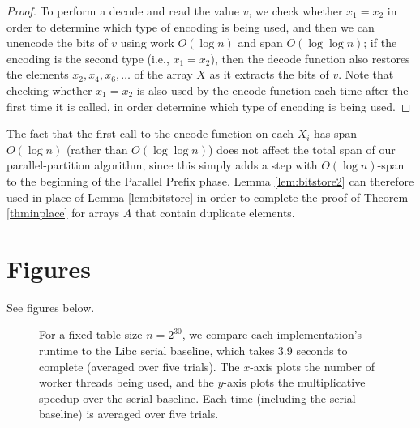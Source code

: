 \documentclass[sigplan, 10pt, nonacm]{acmart}
\theoremstyle{remark}
\theoremstyle{remark}
\begin{document}
\begin{appendices}
\begin{proof}
To perform a decode and read the value $v$, we check whether $x_1 =
x_2$ in order to determine which type of encoding is being used, and
then we can unencode the bits of $v$ using work $O(\log n)$ and span
$O(\log \log n)$; if the encoding is the second type (i.e., $x_1 =
x_2$), then the decode function also restores the elements $x_2, x_4,
x_6, \ldots$ of the array $X$ as it extracts the bits of $v$. Note
that checking whether $x_1 = x_2$ is also used by the encode function
each time after the first time it is called, in order determine which
type of encoding is being used.
\end{proof}

The fact that the first call to the encode function on each $X_i$ has
span $O(\log n)$ (rather than $O(\log \log n)$) does not affect the
total span of our parallel-partition algorithm, since this simply adds
a step with $O(\log n)$-span to the beginning of the Parallel Prefix
phase. Lemma \ref{lem:bitstore2} can therefore used in place of Lemma
\ref{lem:bitstore} in order to complete the proof of Theorem
\ref{thminplace} for arrays $A$ that contain duplicate elements.

\section{Figures}
See figures below.
\begin{figure*}
  \begin{center}
    \CILKtable 
  \end{center}
    \caption{For a fixed table-size $n = 2^{30}$, we compare each
      implementation's runtime to the Libc serial baseline, which takes 3.9
      seconds to complete (averaged over five trials). The $x$-axis
      plots the number of worker threads being used, and the $y$-axis
      plots the multiplicative speedup over the serial baseline. Each
      time (including the serial baseline) is averaged over five trials.}
      \label{tablecilk}
\end{figure*}




\end{appendices}
\end{document}
